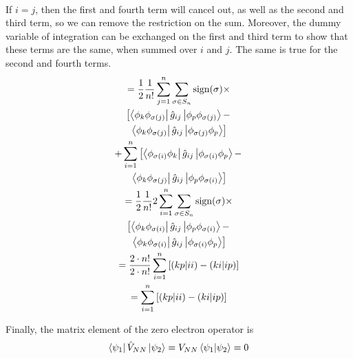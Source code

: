 \documentclass[final,3p,times,twocolumn]{elsarticle}
\begin{document}
\begin{enumerate}
\begin{gather}
\begin{gathered}
	\end{gathered}
	\end{gather}
	If $i = j$, then the first and fourth term will cancel out, as well as the second and third term, so we can remove the restriction on the sum. Moreover, the dummy variable of integration can be exchanged on the first and third term to show that these terms are the same, when summed over $i$ and $j$. The same is true for the second and fourth terms.
	\begin{gather}
	\begin{gathered}
	= \frac{1}{2}\frac{1}{n!} \sum_{j = 1}^n \sum_{\sigma\in S_n} \text{sign}(\sigma) \times \\ \left[ \bra{\phi_{k}\phi_{\sigma(j)}}\hat g_{ij} \ket{\phi_{p}\phi_{\sigma(j)}} - \right.
	\\ \left. \bra{\phi_{k}\phi_{\sigma(j)}}\hat g_{ij} \ket{\phi_{\sigma(j)}\phi_{p}} \right] \\
	+ \sum_{i = 1}^n \left[ \bra{\phi_{\sigma(i)}\phi_{k}}\hat g_{ij} \ket{\phi_{\sigma(i)}\phi_{p}} - \right.\\ \left. \bra{\phi_{k}\phi_{\sigma(j)}}\hat g_{ij} \ket{\phi_{p}\phi_{\sigma(i)}} \right] 
	\end{gathered} \\
	\begin{gathered}
	= \frac{1}{2}\frac{1}{n!} 2 \sum_{i = 1}^n \sum_{\sigma\in S_n} \text{sign}(\sigma) \times \\ \left[ \bra{\phi_{k}\phi_{\sigma(i)}}\hat g_{ij} \ket{\phi_{p}\phi_{\sigma(i)}} - \right.
	\\ \left. \bra{\phi_{k}\phi_{\sigma(i)}}\hat g_{ij} \ket{\phi_{\sigma(i)}\phi_{p}} \right]
	\end{gathered} \\
	= \frac{2\cdot n!}{2\cdot n!} \sum_{i = 1}^n \left[(kp|ii) - (ki|ip)\right] \\
	= \sum_{i = 1}^n \left[(kp|ii) - (ki|ip)\right]
	\end{gather}
	
	Finally, the matrix element of the zero electron operator is
	\begin{gather}
	\bra{\psi_1} \hat V_{NN} \ket{\psi_2} = V_{NN}\bra{\psi_1}\ket{\psi_2} = 0
	\end{gather}
	

\end{enumerate}
\end{document}
